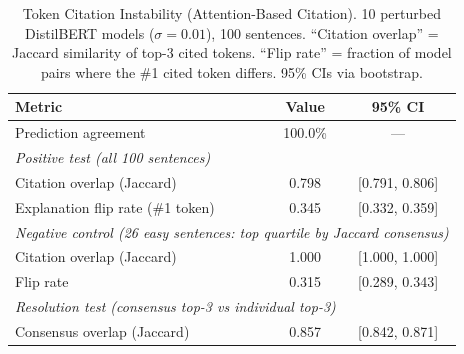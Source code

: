 \begin{table}[t]
\centering
\caption{Token Citation Instability (Attention-Based Citation).
  10 perturbed DistilBERT models ($\sigma=0.01$), 100 sentences.
  ``Citation overlap'' = Jaccard similarity of top-3 cited tokens.
  ``Flip rate'' = fraction of model pairs where the \#1 cited token differs.
  95\% CIs via bootstrap.}
\label{tab:llm_explanation_instability}
\begin{tabular}{lcc}
\toprule
Metric & Value & 95\% CI \\
\midrule
Prediction agreement & 100.0\% & --- \\
\midrule
\multicolumn{3}{l}{\emph{Positive test (all 100 sentences)}} \\
Citation overlap (Jaccard) & 0.798 & [0.791, 0.806] \\
Explanation flip rate (\#1 token) & 0.345 & [0.332, 0.359] \\
\midrule
\multicolumn{3}{l}{\emph{Negative control (26 easy sentences: top quartile by Jaccard consensus)}} \\
Citation overlap (Jaccard) & 1.000 & [1.000, 1.000] \\
Flip rate & 0.315 & [0.289, 0.343] \\
\midrule
\multicolumn{3}{l}{\emph{Resolution test (consensus top-3 vs individual top-3)}} \\
Consensus overlap (Jaccard) & 0.857 & [0.842, 0.871] \\
\bottomrule
\end{tabular}
\end{table}
